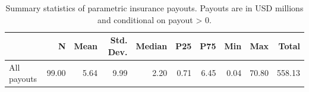 \begin{table}
\caption{Summary statistics of parametric insurance payouts. Payouts are in USD millions and conditional on payout > 0.}
\label{tab:summary_overall}
\begin{tabular}{lrrrrrrrrr}
\toprule
 & N & Mean & Std. Dev. & Median & P25 & P75 & Min & Max & Total \\
\midrule
All payouts & 99.00 & 5.64 & 9.99 & 2.20 & 0.71 & 6.45 & 0.04 & 70.80 & 558.13 \\
\bottomrule
\end{tabular}
\end{table}

